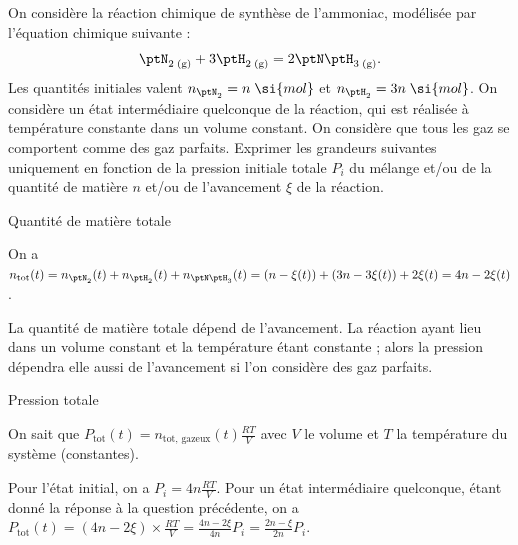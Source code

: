 On considère la réaction chimique de synthèse de l'ammoniac, modélisée par l'équation chimique suivante :
\[
\ptN_{2 \; \mathrm{(g)}} + 3 \ptH_{2 \; \mathrm{(g)}} = 2 \ptN\ptH_{3 \; \mathrm{(g)}}.
\]
Les quantités initiales valent $n_{{\ptN_2}}=n\;\si{mol}$ et $n_{{\ptH_2}}=3n\;\si{mol}$. On considère un état intermédiaire quelconque de la réaction, qui est réalisée à température constante dans un volume constant. On considère que tous les gaz se comportent comme des gaz parfaits. Exprimer les grandeurs suivantes uniquement en fonction de la pression initiale totale $P_i$ du mélange et/ou de la quantité de matière $n$ et/ou de l'avancement $\xi$ de la réaction.

\debutEntrainement



\begin{enonce}
Quantité de matière totale
\end{enonce}


\begin{corrige}
On a $n_\mathrm{tot}(t) = n_{\ptN_2}(t) + n_{\ptH_2}(t) + n_{{\ptN\ptH_3}}(t) = (n-\xi(t)) + (3n-3\xi(t)) + 2\xi(t) = 4n-2\xi(t)$. 

La quantité de matière totale dépend de l'avancement. La réaction ayant lieu dans un volume constant et la température étant constante ; alors la pression dépendra elle aussi de l'avancement si l'on considère des gaz parfaits.  
\end{corrige}



\begin{enonce}
Pression totale
\end{enonce}


\begin{corrige}
On sait que $P_\mathrm{tot}(t) = n_\mathrm{tot,\,gazeux}(t) \frac{RT}{V}$ avec $V$ le volume et $T$ la température du système (constantes). 

Pour l'état initial, on a $P_i=4n\frac{RT}{V}$. Pour un état intermédiaire quelconque, étant donné la réponse à la question précédente, on a $P_\mathrm{tot}(t)=(4n-2\xi) \times \frac{RT}{V} = \frac{4n-2\xi}{4n} P_i= \frac{2n-\xi}{2n} P_i$.
\end{corrige}

